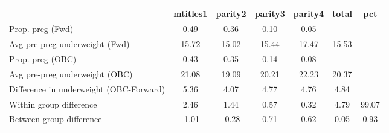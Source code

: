 \begin{tabular}{l*{6}{c}}
\toprule
            &\multicolumn{1}{c}{mtitles1}&\multicolumn{1}{c}{parity2}&\multicolumn{1}{c}{parity3}&\multicolumn{1}{c}{parity4}&\multicolumn{1}{c}{total}&\multicolumn{1}{c}{pct}\\
\midrule
\midrule
Prop. preg (Fwd)&        0.49&        0.36&        0.10&        0.05&            &            \\
Avg pre-preg underweight (Fwd)&       15.72&       15.02&       15.44&       17.47&       15.53&            \\
Prop. preg (OBC)&        0.43&        0.35&        0.14&        0.08&            &            \\
Avg pre-preg underweight (OBC)&       21.08&       19.09&       20.21&       22.23&       20.37&            \\
Difference in underweight (OBC-Forward)&        5.36&        4.07&        4.77&        4.76&        4.84&            \\
Within group difference&        2.46&        1.44&        0.57&        0.32&        4.79&       99.07\\
Between group difference&       -1.01&       -0.28&        0.71&        0.62&        0.05&        0.93\\
\bottomrule
\end{tabular}
